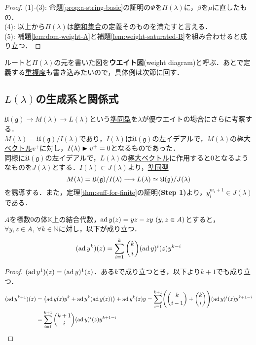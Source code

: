 \documentclass[rep_main]{subfiles}
\begin{document}
\begin{proof}
	(1)-(3): 命題\ref{prop:a-string-basic}の証明の$\Phi$を$\Pi(\lambda)$に，$\beta$を$\mu$に直したもの．\\
	(4): 以上から$\Pi(\lambda)$は\hyperref[def:weight-saturated]{飽和集合}の定義そのものを満たすと言える．\\
	(5): 補題\ref{lem:dom-weight-A}と補題\ref{lem:weight-saturated-B}を組み合わせると成り立つ．
\end{proof}
ルートと$\Pi(\lambda)$の元を書いた図を\textbf{ウエイト図}(weight diagram)と呼ぶ．あとで定義する\hyperref[def:mutiplicity]{重複度}も書き込みたいので，具体例は次節に回す．

\subsection{$L(\lambda)$の生成系と関係式}
$\mathfrak{U}(\mathfrak{g}) \to M(\lambda) \to L(\lambda)$という\hyperref[g-module-hom]{準同型}を$\lambda$が優ウエイトの場合にさらに考察する．\\
$M(\lambda) = \mathfrak{U}(\mathfrak{g}) / I(\lambda)$であり，$I(\lambda)$は$\mathfrak{U}(\mathfrak{g})$の左イデアルで，$M(\lambda)$の\hyperref[def:maximal-vector-rep]{極大ベクトル}$v^+$に対し，$I(\lambda) \blacktriangleright v^+ = 0$となるものであった．\\
同様に$\mathfrak{U}(\mathfrak{g})$の左イデアルで，$L(\lambda)$の\hyperref[def:maximal-vector-rep]{極大ベクトル}に作用すると$0$となるようなものを$J(\lambda)$とする．$I(\lambda) \subset J(\lambda)$より，\hyperref[g-module-hom]{準同型}
\begin{equation}
	M(\lambda) = \mathfrak{U}(\mathfrak{g}) / I(\lambda) \longrightarrow L(\lambda) \simeq \mathfrak{U}(\mathfrak{g}) / J(\lambda)
\end{equation}
を誘導する．また，定理\ref{thm:suff-for-finite}の証明\textbf{(Step 1)}より，$y_i^{m_i + 1} \in J(\lambda)$である．
\begin{mylem}[label=lem:Lie-bracket-power]{}
	$A$を標数$0$の体$\mathbb{K}$上の結合代数，$\operatorname{ad} y(z) = yz - zy\ (y, z \in A)$とすると，\\
	$\forall y, z \in A,\ \forall k \in \mathbb{N}$に対し，以下が成り立つ．
	\begin{equation}
		(\operatorname{ad} y^k)(z) = \sum_{i=1}^k \binom{k}{i}(\operatorname{ad} y)^i(z)y^{k-i}
	\end{equation}
\end{mylem}
\begin{proof}
	$(\operatorname{ad} y^1)(z) = (\operatorname{ad} y)^1(z)$．ある$k$で成り立つとき，以下より$k+1$でも成り立つ．
	\begin{align}
		(\operatorname{ad} y^{k+1})(z) &= \bigl(\operatorname{ad} y(z)y^k + \operatorname{ad} y^k(\operatorname{ad} y(z))\bigr) + \operatorname{ad} y^k(z)y = \sum_{i=1}^{k+1} \Biggl(\binom{k}{i-1} + \binom{k}{i}\Biggr)(\operatorname{ad} y)^i(z)y^{k+1-i} \\
		&= \sum_{i=1}^{k+1} \binom{k+1}{i}(\operatorname{ad} y)^i(z)y^{k+1-i}
	\end{align}
\end{proof}
\end{document}
